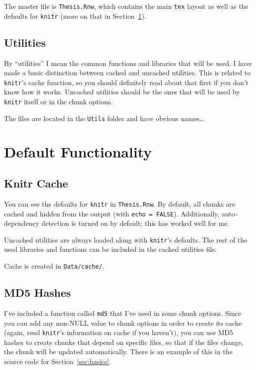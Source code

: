 The master file is \texttt{Thesis.Rnw}, which contains the main \texttt{tex} layout as well as the defaults for \texttt{knitr} (more on that in Section~\ref{sec:default-func}).

\subsection{Utilities}
\label{sec:utilities}

By ``utilities'' I mean the common \R{} functions and libraries that will be used. I have made a basic distinction between cached and uncached utilities. This is related to \texttt{knitr}'s cache function, so you should definitely read about that first if you don't know how it works. Uncached utilities should be the ones that will be used by \texttt{knitr} itself or in the chunk options.

The files are located in the \texttt{Utils} folder and have obvious names\dots

\section{Default Functionality}
\label{sec:default-func}

\subsection{Knitr Cache}

You can see the defaults for \texttt{knitr} in \texttt{Thesis.Rnw}. By default, all chunks are cached and hidden from the output (with \texttt{echo = FALSE}). Additionally, auto-dependency detection is turned on by default; this has worked well for me.

Uncached utilities are always loaded along with \texttt{knitr}'s defaults. The rest of the used libraries and functions can be included in the cached utilities file.

Cache is created in \texttt{Data/cache/}.

\subsection{MD5 Hashes}

I've included a function called \texttt{md5} that I've used in some chunk options. Since you can add any non-NULL value to chunk options in order to create its cache (again, read \texttt{knitr}'s information on cache if you haven't), you can use MD5 hashes to create chunks that depend on specific files, so that if the files change, the chunk will be updated automatically. There is an example of this in the source code for Section~\ref{sec:basics}.

